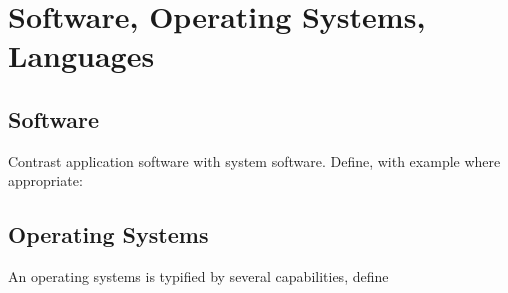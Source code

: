 \section{Software, Operating Systems, Languages}

\begin{questions}
\subsection{Software}
	\question Contrast application software with system software. 
	\question Define, with example where appropriate: 

\subsection{Operating Systems}

	\question An operating systems is typified by several capabilities, define
\end{questions}
